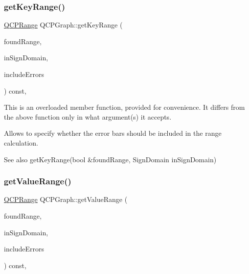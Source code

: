\subsubsection{\texorpdfstring{get\+Key\+Range()}{getKeyRange()}}
{\footnotesize\ttfamily \hyperlink{class_q_c_p_range}{Q\+C\+P\+Range} Q\+C\+P\+Graph\+::get\+Key\+Range (\begin{DoxyParamCaption}\item[{bool \&}]{found\+Range,  }\item[{\hyperlink{class_q_c_p_abstract_plottable_a661743478a1d3c09d28ec2711d7653d8}{Sign\+Domain}}]{in\+Sign\+Domain,  }\item[{bool}]{include\+Errors }\end{DoxyParamCaption}) const\hspace{0.3cm}{\ttfamily [protected]}, {\ttfamily [virtual]}}

This is an overloaded member function, provided for convenience. It differs from the above function only in what argument(s) it accepts.

Allows to specify whether the error bars should be included in the range calculation.

\begin{DoxySeeAlso}{See also}
get\+Key\+Range(bool \&found\+Range, Sign\+Domain in\+Sign\+Domain) 
\end{DoxySeeAlso}
\hypertarget{class_q_c_p_graph_ac23c7702ca836c7055f48e6fc3295ca4}{}\label{class_q_c_p_graph_ac23c7702ca836c7055f48e6fc3295ca4} 
\subsubsection{\texorpdfstring{get\+Value\+Range()}{getValueRange()}}
{\footnotesize\ttfamily \hyperlink{class_q_c_p_range}{Q\+C\+P\+Range} Q\+C\+P\+Graph\+::get\+Value\+Range (\begin{DoxyParamCaption}\item[{bool \&}]{found\+Range,  }\item[{\hyperlink{class_q_c_p_abstract_plottable_a661743478a1d3c09d28ec2711d7653d8}{Sign\+Domain}}]{in\+Sign\+Domain,  }\item[{bool}]{include\+Errors }\end{DoxyParamCaption}) const\hspace{0.3cm}{\ttfamily [protected]}, {\ttfamily [virtual]}}

